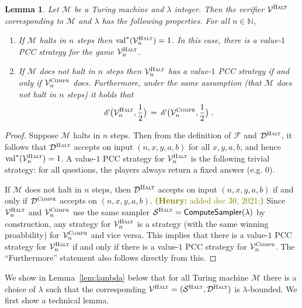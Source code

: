 \documentclass[11pt]{article}
\newtheorem{lemma}[theorem]{Lemma}
\theoremstyle{definition}
\newcommand{\N}{\ensuremath{\mathbb{N}}}
\newcommand{\val}{\ensuremath{\mathrm{val}}}
\newcommand{\sampler}{\mathcal{S}}
\newcommand{\decider}{\mathcal{D}}
\newcommand{\verifier}{\mathcal{V}}
\newcommand{\Ent}{\mathscr{E}}
\newcommand{\compr}{\textsc{Compr}}
\newcommand{\halt}{\textsc{Halt}}
\renewcommand{\cal}[1]{\mathcal{#1}}
\newcommand{\tmstyle}[1]{\ensuremath{\mathsf{#1}}}
\newcommand{\ComputeSampler}{\tmstyle{ComputeSampler}}
\newcommand{\hnote}[1]{\textcolor{olive}{\small {\textbf{(Henry:} #1\textbf{) }}}}
\newcommand{\hnote}[1]{}
\begin{document}
\begin{lemma}\label{lem:dhalt-values}
  Let $\cal{M}$ be a Turing machine and $\lambda$ integer.
  Then the verifier $\verifier^\halt$ corresponding to $\cal{M}$ and $\lambda$ has the following properties. For all $n \in \N$,
  \begin{enumerate}
  \item If $\cal{M}$ halts in $n$ steps then
    $\val^*(\verifier^\halt_n)=1$.
   In this case, there is a value-$1$ PCC strategy for the game
    $\verifier^\halt_n$.
  \item If $\cal{M}$ does not halt in $n$ steps then
    $\verifier^\halt_n$ has a value-$1$ PCC strategy if and only if
    $\verifier^\compr_n$ does.
    Furthermore, under the same assumption (that $\cal{M}$ does not halt in $n$ steps) it holds that 
    \begin{equation*}
      \Ent\big(\verifier^\halt_n, \frac{1}{2}\big) \,=\,
      \Ent\big(\verifier^\compr_n, \frac{1}{2}\big)\;.
    \end{equation*}
  \end{enumerate}
\end{lemma}
		
\begin{proof}
  Suppose $\cal{M}$ halts in $n$ steps.
  Then from the definition of $\cal{F}$ and $\decider^\halt$, it follows that
  $\decider^{\halt}$ accepts on input $(n, x, y, a, b)$ for all $x,y,a,b$, and
  hence $\val^*(\verifier^\halt_n) = 1$. A value-$1$ PCC
  strategy for $\verifier^\halt_n$ is the following trivial strategy: for all questions, the players always
  return a fixed answer (e.g. $0$). 
  
  
  If $\cal{M}$ does not halt in $n$ steps, then $\decider^{\halt}$ accepts on
  input $(n, x, y, a,b)$ if and only if $\decider^\compr$ accepts on $(n, x, y,
  a,b)$. \hnote{added dec 30, 2021:}  Since $\verifier^\halt_n$ and $\verifier^\compr_n$ use the same sampler $\sampler^\halt = \ComputeSampler(\lambda)$
  by construction, any strategy for $\verifier^\halt_n$ is a strategy (with the same winning proabbility) for $\verifier^\compr_n$ and vice versa. This implies that there is a value-$1$ PCC strategy for $\verifier^\halt_n$ if and only if
  there is a value-$1$ PCC strategy for $\verifier^\compr_n$. The ``Furthermore'' statement also follows directly from this.
\end{proof}

We show in Lemma~\ref{lem:lambda} below that for all Turing machine $\cal{M}$ there is a choice of
$\lambda$ such that the corresponding $\verifier^\halt = (\sampler^\halt, \decider^\halt)$ is
$\lambda$-bounded. We first show a technical
lemma.
\end{document}
